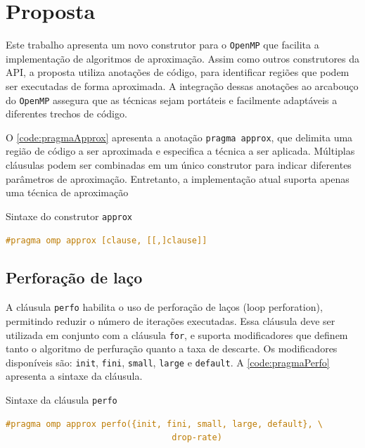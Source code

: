 \chapter{Proposta}\label{cap:proposta}

Este trabalho apresenta um novo construtor para o \texttt{OpenMP} que facilita a implementação de algoritmos de aproximação. Assim como outros construtores da API, a proposta utiliza anotações de código, para identificar regiões que podem ser executadas de forma aproximada. A integração dessas anotações ao arcabouço do \texttt{OpenMP} assegura que as técnicas sejam portáteis e facilmente adaptáveis a diferentes trechos de código.

O \autoref{code:pragmaApprox} apresenta a anotação \texttt{pragma approx}, que delimita uma região de código a ser aproximada e especifica a técnica a ser aplicada. Múltiplas cláusulas podem ser combinadas em um único construtor para indicar diferentes parâmetros de aproximação. Entretanto, a implementação atual suporta apenas uma técnica de aproximação

\begin{sourcecode}[htb]\caption{\label{code:pragmaApprox}Sintaxe do construtor \texttt{approx}}
    \begin{lstlisting}[frame=single, language=C++]
        #pragma omp approx [clause, [[,]clause]]
    \end{lstlisting}
    \fonte{}
\end{sourcecode}

\section{Perforação de laço}\label{subsec:pragmaPerfo}

A cláusula \texttt{perfo} habilita o uso de perforação de laços (loop perforation), permitindo reduzir o número de iterações executadas. Essa cláusula deve ser utilizada em conjunto com a cláusula \texttt{for}, e suporta modificadores que definem tanto o algoritmo de perfuração quanto a taxa de descarte.
Os modificadores disponíveis são: \texttt{init}, \texttt{fini}, \texttt{small}, \texttt{large} e \texttt{default}.
A \autoref{code:pragmaPerfo} apresenta a sintaxe da cláusula.

\begin{sourcecode}[htb]
    \caption{\label{code:pragmaPerfo}Sintaxe da cláusula \texttt{perfo}}
    \begin{lstlisting}[frame=single, language=C++]
        #pragma omp approx perfo({init, fini, small, large, default}, \
                                 drop-rate)
    \end{lstlisting}
    \fonte{}
\end{sourcecode}

